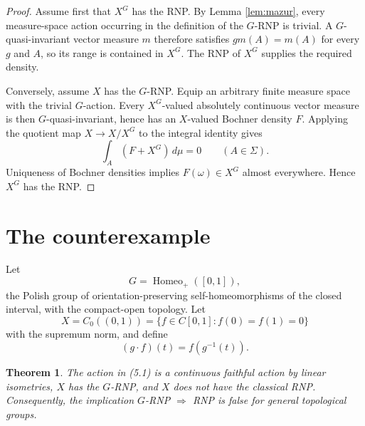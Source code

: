 \documentclass[11pt]{article}
\newtheorem{theorem}{Theorem}[section]
\theoremstyle{remark}
\newcommand{\Homeo}{\operatorname{Homeo}}
\begin{document}
\begin{proof}
Assume first that $X^G$ has the RNP.  By Lemma \ref{lem:mazur}, every
measure-space action occurring in the definition of the $G$-RNP is trivial.
A $G$-quasi-invariant vector measure $m$ therefore satisfies
$gm(A)=m(A)$ for every $g$ and $A$, so its range is contained in $X^G$.
The RNP of $X^G$ supplies the required density.

Conversely, assume $X$ has the $G$-RNP.  Equip an arbitrary finite measure
space with the trivial $G$-action.  Every $X^G$-valued absolutely continuous
vector measure is then $G$-quasi-invariant, hence has an $X$-valued Bochner
density $F$.  Applying the quotient map $X\to X/X^G$ to the integral
identity gives
\[
 \int_A(F+X^G)\,d\mu=0
 \qquad(A\in\Sigma).
\]
Uniqueness of Bochner densities implies $F(\omega)\in X^G$ almost
everywhere.  Hence $X^G$ has the RNP.
\end{proof}

\section{The counterexample}

Let
\[
 G=\Homeo_+([0,1]),
\]
the Polish group of orientation-preserving self-homeomorphisms of the closed
interval, with the compact-open topology.  Let
\[
 X=C_0((0,1))
 =\{f\in C[0,1]:f(0)=f(1)=0\}
\]
with the supremum norm, and define
\begin{equation}
 (g\cdot f)(t)=f(g^{-1}(t)).
 \tag{5.1}
\end{equation}

\begin{theorem}\label{thm:counterexample}
The action in (5.1) is a continuous faithful action by linear isometries,
$X$ has the $G$-RNP, and $X$ does not have the classical RNP.  Consequently,
the implication $G$-RNP $\Rightarrow$ RNP is false for general topological
groups.
\end{theorem}
\end{document}
